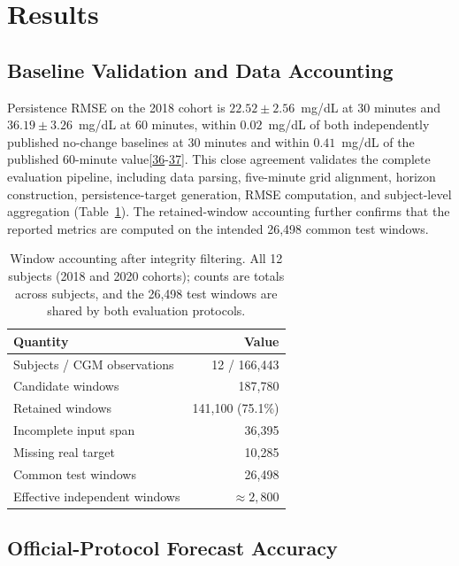 \documentclass[journal]{IEEEtran}
\begin{document}
\section{Results}

\subsection{Baseline Validation and Data Accounting}

Persistence RMSE on the 2018 cohort is $22.52 \pm 2.56$~mg/dL at 30 minutes and $36.19 \pm 3.26$~mg/dL at 60 minutes, within $0.02$~mg/dL of both independently published no-change baselines at 30 minutes and within $0.41$~mg/dL of the published 60-minute value[\hyperref[ref56label]{36}-\hyperref[ref57label]{37}]. This close agreement validates the complete evaluation pipeline, including data parsing, five-minute grid alignment, horizon construction, persistence-target generation, RMSE computation, and subject-level aggregation (Table~\ref{tab:windows}). The retained-window accounting further confirms that the reported metrics are computed on the intended 26,498 common test windows. 

\begin{table}[t]
\centering
\caption{Window accounting after integrity filtering. All 12 subjects (2018 and 2020 cohorts); counts are totals across subjects, and the 26,498 test windows are shared by both evaluation protocols.}
\label{tab:windows}
\footnotesize
\begin{tabular}{lr}
\toprule
Quantity & Value \\
\midrule
Subjects / CGM observations & 12 / 166,443 \\
Candidate windows & 187,780 \\
Retained windows & 141,100 (75.1\%) \\
Incomplete input span & 36,395 \\
Missing real target & 10,285 \\
Common test windows & 26,498 \\
Effective independent windows & $\approx 2{,}800$ \\
\bottomrule
\end{tabular}
\end{table}

\subsection{Official-Protocol Forecast Accuracy}
\end{document}
